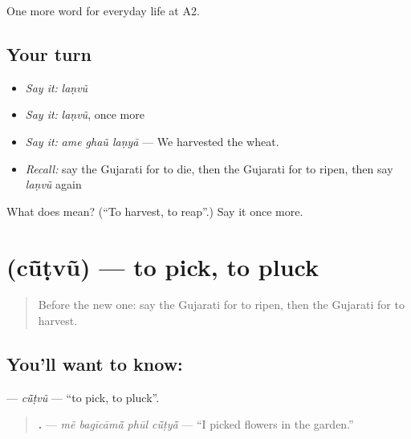 \begin{grammarlens}[title={What you've built}]
One more word for everyday life at A2.
\end{grammarlens}

\subsection*{Your turn}
\begin{itemize}
\raggedright
  \item \emph{Say it:} \emph{laṇvũ}
  \item \emph{Say it:} \emph{laṇvũ}, once more
  \item \emph{Say it:} \emph{ame ghaũ laṇyā} — We harvested the wheat.
  \item \emph{Recall:} say the Gujarati for to die, then the Gujarati for to ripen, then say \emph{laṇvũ} again
\end{itemize}

\begin{tcolorbox}[breakable,colback=teal!4,colframe=teal!35!black,title={Before you move on}]
What does  mean? (\textquotedblleft{}To harvest, to reap\textquotedblright{}.) Say it once more.
\end{tcolorbox}
\section[\texorpdfstring{\gu{ચૂંટવું} (cū̃ṭvũ)}{ચૂંટવું (cū̃ṭvũ)}]{ (cū̃ṭvũ) — to pick, to pluck}

\label{lesson:GU-C242-cutvu}



\begin{quote}
Before the new one: say the Gujarati for to ripen, then the Gujarati for to harvest.
\end{quote}

\subsection*{You'll want to know: }
\textbf{} — \emph{cū̃ṭvũ} — \textquotedblleft{}to pick, to pluck\textquotedblright{}.

\begin{quote}
\textbf{   .} — \emph{mẽ bagīcāmā̃ phūl cū̃ṭyā̃} — \textquotedblleft{}I picked flowers in the garden.\textquotedblright{}
\end{quote}

